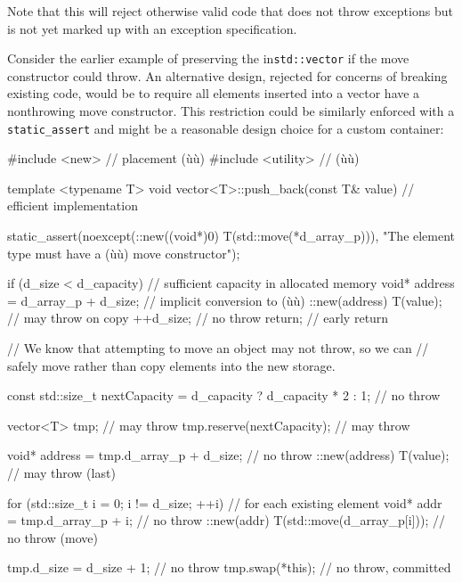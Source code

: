 \noindent Note that this will reject otherwise valid code that does not throw
exceptions but is not yet marked up with an exception specification.

Consider the earlier example of preserving the  in\linebreak[4] \lstinline!std::vector! if the move
constructor could throw. An alternative design, rejected for concerns of
breaking existing code, would be to require all elements inserted into a
vector have a nonthrowing move constructor. This restriction could be
similarly enforced with a \lstinline!static_assert! and might be a
reasonable design choice for a custom container:

\begin{emcppslisting}
#include <new>      // placement (ù{}ù)
#include <utility>  // (ù{}ù)

template <typename T>
void vector<T>::push_back(const T& value)  // efficient implementation
{
    static_assert(noexcept(::new((void*)0) T(std::move(*d_array_p))),
                 "The element type must have a (ù{}ù) move constructor");

    if (d_size < d_capacity)  // sufficient capacity in allocated memory
    {
        void* address = d_array_p + d_size;  // implicit conversion to (ù{}ù)
        ::new(address) T(value);             // may throw on copy
        ++d_size;                            // no throw
        return;                              // early return
    }

    // We know that attempting to move an object may not throw, so we can
    // safely move rather than copy elements into the new storage.

    const std::size_t nextCapacity = d_capacity ? d_capacity * 2
                                                : 1;              // no throw

    vector<T> tmp;                                  // may throw
    tmp.reserve(nextCapacity);                   // may throw

    void* address = tmp.d_array_p + d_size;      // no throw
    ::new(address) T(value);                     // may throw (last)

    for (std::size_t i = 0; i != d_size; ++i)    // for each existing element
    {
        void* addr = tmp.d_array_p + i;          // no throw
        ::new(addr) T(std::move(d_array_p[i]));  // no throw (move)
    }

    tmp.d_size = d_size + 1;  // no throw
    tmp.swap(*this);          // no throw, committed
}
\end{emcppslisting}
    

